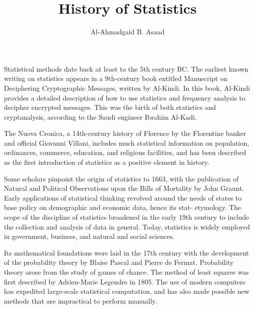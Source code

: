 \documentclass[12pt]{article}
\title{History of Statistics}
\author{Al-Ahmadgaid B. Asaad}
\begin{document}
\maketitle
Statistical methods date back at least to the 5th century BC.
The earliest known writing on statistics appears in a 9th-century
book entitled Manuscript on Deciphering Cryptographic Messages,
written by Al-Kindi. In this book, Al-Kindi provides a detailed
description of how to use statistics and frequency analysis to
decipher encrypted messages. This was the birth of both statistics
and cryptanalysis, according to the Saudi engineer Ibrahim Al-Kadi.
 
The Nuova Cronica, a 14th-century history of Florence by the
Florentine banker and official Giovanni Villani, includes much
statistical information on population, ordinances, commerce,
education, and religious facilities, and has been described as
the first introduction of statistics as a positive element in history.
 
Some scholars pinpoint the origin of statistics to 1663, with
the publication of Natural and Political Observations upon the
Bills of Mortality by John Graunt. Early applications of statistical
thinking revolved around the needs of states to base policy on
demographic and economic data, hence its stat- etymology. The scope
of the discipline of statistics broadened in the early 19th century
to include the collection and analysis of data in general. Today,
statistics is widely employed in government, business, and natural
and social sciences.
 
Its mathematical foundations were laid in the 17th century with the
development of the probability theory by Blaise Pascal and Pierre
de Fermat. Probability theory arose from the study of games of chance.
The method of least squares was first described by Adrien-Marie Legendre
in 1805. The use of modern computers has expedited large-scale statistical
computation, and has also made possible new methods that are impractical
to perform manually.
\end{document}
